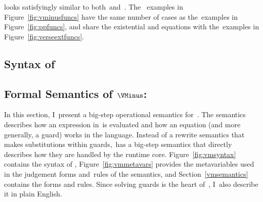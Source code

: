 \documentclass[manuscript,screen 12pt, nonacm]{acmart}
\begin{document}
    \VMinus looks satisfyingly similar to both~\PPlus and~\VC. The~\VMinus
    examples in Figure~\ref{fig:vminusfuncs} have the same number of cases as
    the~\PPlus examples in Figure~\ref{fig:ppfuncs}, and share the existential
    and equations with the~\VC examples in Figure~\ref{fig:verseextfuncs}. 
   
\subsection{Syntax of~\VMinus}





\subsection{Formal Semantics of $\VMinus$:}
    In this section, I~present a big-step operational semantics for~\VMinus. The
    semantics describes how an expression in~\VMinus is evaluated and how an
    equation (and more generally, a guard) works in the language. Instead of a
    rewrite semantics that makes substitutions within guards,~\VMinus has a
    big-step semantics that directly describes how they are handled by the
    runtime core. Figure~\ref{fig:vmsyntax} contains the syntax of \VMinus,
    Figure~\ref{fig:vmmetavars} provides the metavariables used in the judgement
    forms and~rules of the semantics, and Section~\ref{vmsemantics} contains the
    forms and rules. Since solving guards is the heart of~\VMinus, I~also
    describe it in plain English.
\end{document}
